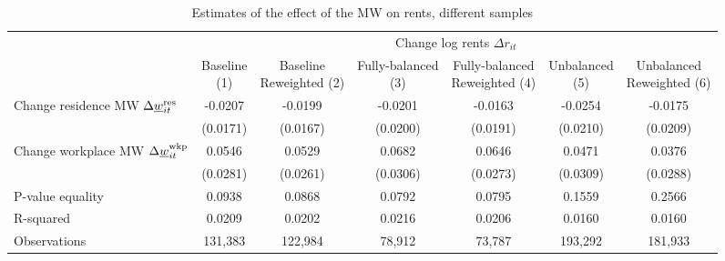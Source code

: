 \begin{landscape}
\begin{table}[hbt!]
    \centering
    \caption{Estimates of the effect of the MW on rents, different samples}
    \label{tab:static_sample}

    \begin{tabular}{@{}lcccccc@{}}
        \toprule
                                             & \multicolumn{6}{c}{Change log rents $\Delta r_{it}$}                   \\ \cmidrule(l){2-7} 
                                             & \shortstack{Baseline\\(1)}       & \shortstack{Baseline\\Reweighted (2)}
                                             & \shortstack{Fully-balanced\\(3)} & \shortstack{Fully-balanced\\Reweighted (4)}  
                                             & \shortstack{Unbalanced\\(5)}     & \shortstack{Unbalanced\\Reweighted (6)}  \\ \midrule
        Change residence MW 
                  $\Delta\underline{w}_{it}^{\text{res}}$    & -0.0207      & -0.0199        & -0.0201       & -0.0163    & -0.0254       & -0.0175     \\
                                             & (0.0171)    & (0.0167)      & (0.0200)     & (0.0191)  & (0.0210)     & (0.0209)   \\
        Change workplace MW 
                   $\Delta\underline{w}_{it}^{\text{wkp}}$   & 0.0546      & 0.0529        & 0.0682       & 0.0646    & 0.0471       & 0.0376     \\
                                             & (0.0281)    & (0.0261)      & (0.0306)     & (0.0273)  & (0.0309)     & (0.0288)   \\ \midrule
        P-value equality                     & 0.0938      & 0.0868        & 0.0792       & 0.0795    & 0.1559       & 0.2566     \\
        R-squared                            & 0.0209      & 0.0202        & 0.0216       & 0.0206    & 0.0160       & 0.0160     \\
        Observations                         & 131,383     & 122,984       & 78,912      & 73,787   & 193,292      & 181,933    \\ \bottomrule
    \end{tabular}


\end{table}
\end{landscape}
